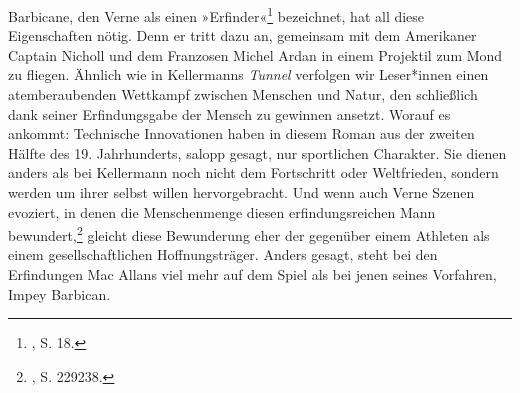 \documentclass[%
	fontsize=10pt,%
	twoside,%
	headings=optiontoheadandtoc,%
	showtrims]{scrbook}
\makeatletter
\renewcommand{\hrulefill}{\newpage\par\@afterindentfalse\@afterheading}
\makeatother
\begin{document}
\par Barbicane, den Verne als einen »Erfinder«\footnote{\cite[][]{verne2013a}, S. 18.}  bezeichnet, hat all diese Eigenschaften nötig. Denn er tritt dazu an, gemeinsam mit dem Amerikaner Captain Nicholl und dem Franzosen Michel Ardan in einem Projektil zum Mond zu fliegen. Ähnlich wie in Kellermanns \emph{Tunnel} verfolgen wir Leser*innen einen atemberaubenden Wettkampf zwischen Menschen und Natur, den schließlich dank seiner Erfindungsgabe der Mensch zu gewinnen ansetzt. Worauf es ankommt: Technische Innovationen haben in diesem Roman aus der zweiten Hälfte des 19. Jahrhunderts, salopp gesagt, nur sportlichen Charakter. Sie dienen anders als bei Kellermann noch nicht dem Fortschritt oder Weltfrieden, sondern werden um ihrer selbst willen hervorgebracht. Und wenn auch Verne Szenen evoziert, in denen die Menschenmenge diesen erfindungsreichen Mann bewundert,\footnote{\cite[][]{verne2013a}, S. 229\textendash{}238.}  gleicht diese Bewunderung eher der gegenüber einem Athleten als einem gesellschaftlichen Hoffnungsträger. Anders gesagt, steht bei den Erfindungen Mac Allans viel mehr auf dem Spiel als bei jenen seines Vorfahren, Impey Barbican.\hrulefill
\end{document}
